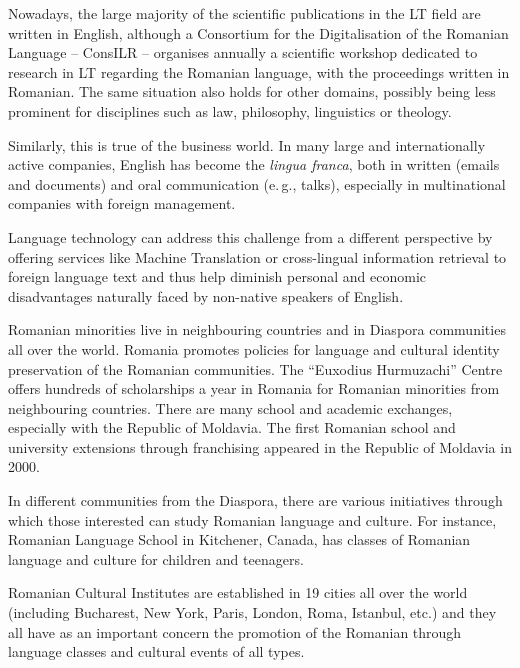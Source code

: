\begin{multicols}{2}


Nowadays, the large majority of the scientific publications in the LT field are written in English, although a Consortium for the Digitalisation of the Romanian Language – ConsILR – organises annually a scientific workshop dedicated to research in LT regarding the Romanian language, with the proceedings written in Romanian. The same situation also holds for other domains, possibly being less prominent for disciplines such as law, philosophy, linguistics or theology. 

Similarly, this is true of the business world. In many large and internationally active companies, English has become the \textit{lingua franca}, both in written (emails and documents) and oral communication (e.\,g., talks), especially in multinational companies with foreign management.

Language technology can address this challenge from a different perspective by offering services like Machine Translation or cross-lingual information retrieval to foreign language text and thus help diminish personal and economic disadvantages naturally faced by non-native speakers of English.

Romanian minorities live in neighbouring countries and in Diaspora communities all over the world. Romania promotes policies for language and cultural identity preservation of the Romanian communities. The ``Euxodius Hurmuzachi'' Centre offers hundreds of scholarships a year in Romania for Romanian minorities from neighbouring countries. There are many school and academic exchanges, especially with the Republic of Moldavia. The first Romanian school and university extensions through franchising appeared in the Republic of Moldavia in 2000.

In different communities from the Diaspora, there are various initiatives through which those interested can study Romanian language and culture. For instance, Romanian Language School in Kitchener, Canada, has classes of Romanian language and culture for children and teenagers.

Romanian Cultural Institutes are established in 19 cities all over the world (including Bucharest, New York, Paris, London, Roma, Istanbul, etc.) and they all have as an important concern the promotion of the Romanian through language classes and cultural events of all types.


\end{multicols}
